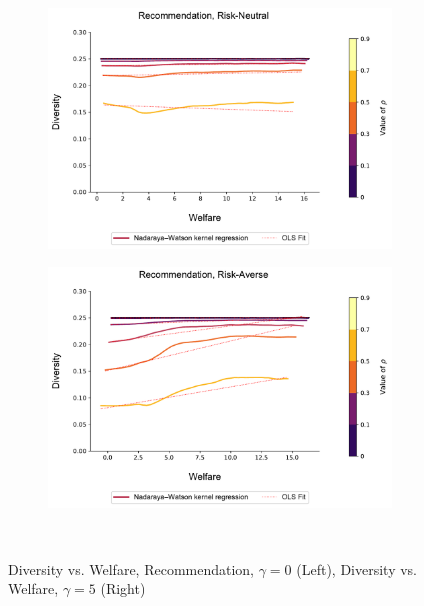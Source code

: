 \documentclass[format=acmsmall, review=false]{acmart}
\begin{document}
\begin{figure}[t]
\begin{subfigure}{.45\textwidth}
\includegraphics[width=1.05\linewidth]{figures/diversity_welfare_rn_partial.pdf}
\end{subfigure}
\begin{subfigure}{.45\textwidth}
\includegraphics[width=1.05\linewidth]{figures/diversity_welfare_ra_partial.pdf}
\end{subfigure}\\
\caption{Diversity vs. Welfare, Recommendation, $\gamma = 0$ (Left), Diversity vs. Welfare, $\gamma = 5$ (Right)}\label{fig:diversity_welfare_ra_partial}
\end{figure}
\end{document}
